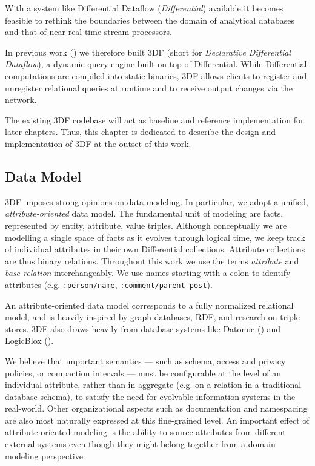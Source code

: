 \documentclass[../index.tex]{subfiles}
\begin{document}
With a system like Differential Dataflow (\emph{Differential})
available it becomes feasible to rethink the boundaries between the
domain of analytical databases and that of near real-time stream
processors.

In previous work (\cite{declarative}) we therefore built 3DF (short
for \emph{Declarative Differential Dataflow}), a dynamic query engine
built on top of Differential. While Differential computations are
compiled into static binaries, 3DF allows clients to register and
unregister relational queries at runtime and to receive output changes
via the network.

The existing 3DF codebase will act as baseline and reference
implementation for later chapters. Thus, this chapter is dedicated to
describe the design and implementation of 3DF at the outset of this
work.

\subsection{Data Model} \label{3df-data-model}

3DF imposes strong opinions on data modeling. In particular, we adopt
a unified, \emph{attribute-oriented} data model. The fundamental unit
of modeling are facts, represented by entity, attribute, value
triples. Although conceptually we are modelling a single space of
facts as it evolves through logical time, we keep track of individual
attributes in their own Differential collections. Attribute
collections are thus binary relations. Throughout this work we use the
terms \emph{attribute} and \emph{base relation} interchangeably. We
use names starting with a colon to identify attributes
(e.g. \texttt{:person/name}, \texttt{:comment/parent-post}).

An attribute-oriented data model corresponds to a fully normalized
relational model, and is heavily inspired by graph databases, RDF, and
research on triple stores. 3DF also draws heavily from database
systems like Datomic (\cite{datomic}) and LogicBlox
(\cite{aref2015design}).

We believe that important semantics — such as schema, access and
privacy policies, or compaction intervals — must be configurable at
the level of an individual attribute, rather than in aggregate
(e.g. on a relation in a traditional database schema), to satisfy the
need for evolvable information systems in the real-world. Other
organizational aspects such as documentation and namespacing are also
most naturally expressed at this fine-grained level. An important
effect of attribute-oriented modeling is the ability to source
attributes from different external systems even though they might
belong together from a domain modeling perspective.
\end{document}

